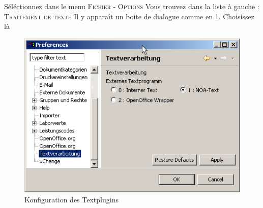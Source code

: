 Séléctionnez dans le menu  \textsc{Fichier - Options} Vous trouvez dans la liste à gauche : \textsc{Traitement de texte}
Il y apparaît un boite de dialogue comme en \ref{fig:text1}. Choisissez là  \glqq
\begin{figure}[htp]
\begin{center}
  \includegraphics{images/text1}
  \caption{Konfiguration des Textplugins}
  \label{fig:text1}
\end{center}
\end{figure}

